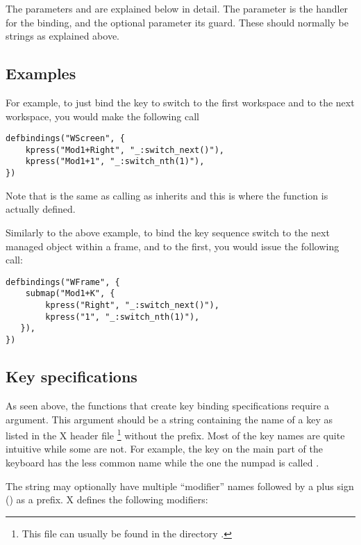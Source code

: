 The parameters  and  are explained below
in detail. The parameter  is the handler for the binding,
and the optional parameter  its guard. These should normally
be strings as explained above. 

\subsection{Examples}

For example, to just bind the key  to switch to the first
workspace and  to the next workspace, you would make the
following call
\begin{verbatim}
defbindings("WScreen", {
    kpress("Mod1+Right", "_:switch_next()"),
    kpress("Mod1+1", "_:switch_nth(1)"),
})
\end{verbatim}

Note that  is the same as calling
 as  inherits
 and this is where the function is actually defined.

Similarly to the above example, to bind the key sequence  
switch to the next managed object within a frame, and  to the
first, you would issue the following call:
\begin{verbatim}
defbindings("WFrame", {
    submap("Mod1+K", {
        kpress("Right", "_:switch_next()"),
        kpress("1", "_:switch_nth(1)"),
   }),
})
\end{verbatim}


\subsection{Key specifications}

As seen above, the functions that create key binding specifications require
a  argument. This argument should be a string containing the
name of a key as listed in the X header file %
\footnote{This file can usually be found in the directory
.} without the  prefix.
Most of the key names are quite intuitive while some are not. For example,
the  key on the main part of the keyboard has the less common
name  while the one the numpad is called .

The  string may optionally have multiple ``modifier'' names
followed by a plus sign (\code{+}) as a prefix. X defines the following
modifiers:

